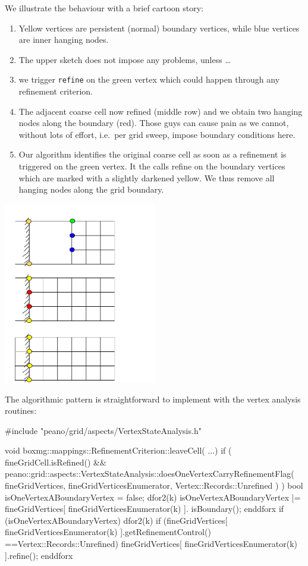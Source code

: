 \noindent
We illustrate the behaviour with a brief cartoon story:
\begin{enumerate}
  \item Yellow vertices are persistent (normal) boundary vertices, while blue
  vertices are inner hanging nodes.
  \item The upper sketch does not impose any problems, unless \ldots
  \item we trigger \texttt{refine} on the green vertex which could happen
  through any refinement criterion.
  \item The adjacent coarse cell now refined (middle row) and we obtain two
  hanging nodes along the boundary (red). Those guys can cause pain as we
  cannot, without lots of effort, i.e.~per grid sweep, impose boundary
  conditions here.
  \item Our algorithm identifies the original coarse cell as soon as a
  refinement is triggered on the green vertex. It the calls refine on the
  boundary vertices which are marked with a slightly darkened yellow. We thus
  remove all hanging nodes along the grid boundary.
\end{enumerate}

\begin{center}
  \includegraphics[width=0.5\textwidth]{98_patterns/boundaries-without-hanging-nodes.pdf}
\end{center}

\noindent
The algorithmic pattern is straightforward to implement with the vertex analysis
routines:
\begin{code}
#include "peano/grid/aspects/VertexStateAnalysis.h"

void boxmg::mappings::RefinementCriterion::leaveCell( ...) {
  if (
    fineGridCell.isRefined()
    &&
    peano::grid::aspects::VertexStateAnalysis::doesOneVertexCarryRefinementFlag(
      fineGridVertices, fineGridVerticesEnumerator, Vertex::Records::Unrefined
    )
  ) {
    bool isOneVertexABoundaryVertex = false;
    dfor2(k)
      isOneVertexABoundaryVertex |= fineGridVertices[ fineGridVerticesEnumerator(k) ].
        isBoundary();
    enddforx
    if (isOneVertexABoundaryVertex) {
      dfor2(k)
        if (fineGridVertices[ fineGridVerticesEnumerator(k) ].getRefinementControl()
          ==Vertex::Records::Unrefined) {
          fineGridVertices[ fineGridVerticesEnumerator(k) ].refine();
        }
      enddforx
    }
  }
}
\end{code}
